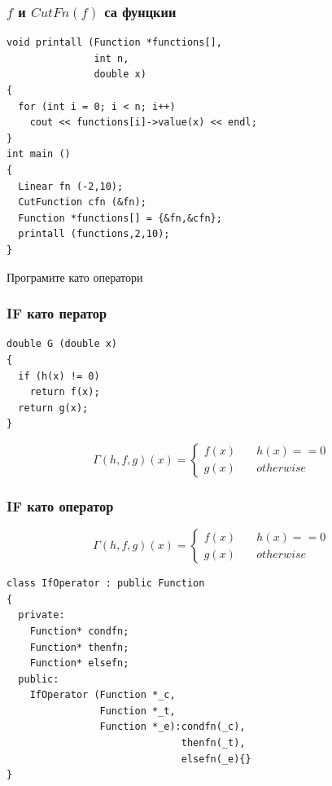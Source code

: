 \documentclass{beamer}
\begin{document}
\begin{frame}[fragile]
\frametitle{$f$ и $CutFn(f)$ са фунцкии}


\begin{flushleft}
\begin{lstlisting}
void printall (Function *functions[],
               int n, 
               double x)
{
  for (int i = 0; i < n; i++)
    cout << functions[i]->value(x) << endl;
}
int main ()
{
  Linear fn (-2,10);
  CutFunction cfn (&fn);
  Function *functions[] = {&fn,&cfn};
  printall (functions,2,10);
}
\end{lstlisting}
  
\end{flushleft}
\end{frame}


\begin{frame}
\centerline{Програмите като оператори}
\end{frame}


\begin{frame}[fragile]
\frametitle{IF като ператор}

\begin{center}

\begin{lstlisting}
double G (double x)
{
  if (h(x) != 0)
    return f(x);
  return g(x);
}
\end{lstlisting}
  
\end{center}


$$
\Gamma(h,f,g)(x) = \left\{
        \begin{array}{ll}
            f(x) & \quad h(x) == 0 \\
            g(x) & \quad otherwise
        \end{array}
    \right.
$$



\end{frame}




\begin{frame}[fragile]
\frametitle{IF като оператор}

\begin{center}
$$
\Gamma(h,f,g)(x) = \left\{
        \begin{array}{ll}
            f(x) & \quad h(x) == 0 \\
            g(x) & \quad otherwise
        \end{array}
    \right.
$$


\begin{lstlisting}
class IfOperator : public Function
{
  private:
    Function* condfn;
    Function* thenfn;
    Function* elsefn;
  public:
    IfOperator (Function *_c, 
                Function *_t,
                Function *_e):condfn(_c),
                              thenfn(_t),
                              elsefn(_e){}
}
\end{lstlisting}
  
\end{center}


\end{frame}
\end{document}
